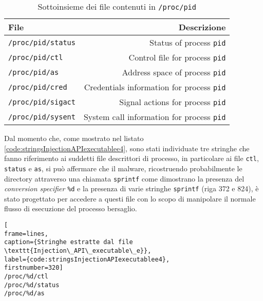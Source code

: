\documentclass[10pt,a4paper, titlepage]{report}
\begin{document}
\begin{table}[h!]
  \begin{center}
    \caption{Sottoinsieme dei file contenuti in \texttt{/proc/pid} }
    \centering
    \label{tab:ProcessFiles}
    
    \begin{tabular}{l|r}
      \toprule
      File & Descrizione \\
      \midrule
      \texttt{/proc/pid/status} & Status of process \texttt{pid} \\
      
      \texttt{/proc/pid/ctl} & Control file for process \texttt{pid} \\
      
      \texttt{/proc/pid/as} & Address space of process \texttt{pid} \\
      
      \texttt{/proc/pid/cred} & Credentials information for process \texttt{pid} \\
      
      \texttt{/proc/pid/sigact} & Signal actions for process \texttt{pid} \\
      
      \texttt{/proc/pid/sysent} & System call information for process \texttt{pid}\\
       
      \bottomrule
    \end{tabular}
  \end{center}
\end{table}

Dal momento che, come mostrato nel listato \ref{code:stringsInjectionAPIexecutablee4}, sono stati individuate tre stringhe che fanno riferimento ai suddetti file descrittori di processo, in particolare ai file \texttt{ctl}, \texttt{status} e \texttt{as}, si può affermare che il malware, ricostruendo probabilmente le directory attraverso una chiamata \texttt{sprintf} come dimostrano la presenza del \textit{conversion specifier} \texttt{\%d} e la presenza di varie stringhe \texttt{sprintf} (riga 372 e 824), è stato progettato per accedere a questi file con lo scopo di manipolare il normale flusso di esecuzione del processo bersaglio.  

\begin{lstlisting}[
frame=lines, 
caption={Stringhe estratte dal file \texttt{Injection\_API\_executable\_e}},
label={code:stringsInjectionAPIexecutablee4},
firstnumber=320]
/proc/%d/ctl
/proc/%d/status
/proc/%d/as
\end{lstlisting}
\end{document}
